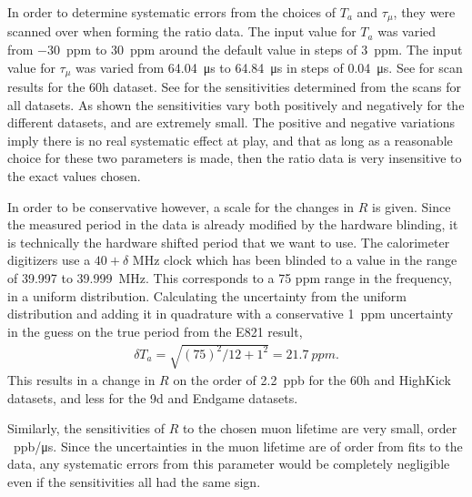 In order to determine systematic errors from the choices of $T_{a}$ and $\tau_{\mu}$, they were scanned over when forming the ratio data. The input value for $T_{a}$ was varied from \SI{-30}{ppm} to \SI{+30}{ppm} around the default value in steps of \SI{3}{ppm}. The input value for $\tau_{\mu}$ was varied from \SI{64.04}{\micro s} to \SI{64.84}{\micro s} in steps of \SI{0.04}{\micro s}. See  for scan results for the 60h dataset. See  for the sensitivities determined from the scans for all datasets. As shown the sensitivities vary both positively and negatively for the different datasets, and are extremely small. The positive and negative variations imply there is no real systematic effect at play, and that as long as a reasonable choice for these two parameters is made, then the ratio data is very insensitive to the exact values chosen. 

In order to be conservative however, a scale for the changes in $R$ is given. Since the measured \gmtwo period in the data is already modified by the hardware blinding, it is technically the hardware shifted \gmtwo period that we want to use. The calorimeter digitizers use a $40 + \delta$ MHz clock which has been blinded to a value in the range of 39.997 to \SI{39.999}{MHz}\cite{ClockManual}. This corresponds to a 75 ppm range in the frequency, in a uniform distribution. Calculating the uncertainty from the uniform distribution and adding it in quadrature with a conservative \SI{1}{ppm} uncertainty in the guess on the true \gmtwo period from the E821 result, 
            \begin{align}
                \delta T_{a} = \sqrt{(75)^{2}/12 + 1^{2}} = \SI{21.7}{ppm}.
            \end{align}
This results in a change in $R$ on the order of \SI{2.2}{ppb} for the 60h and HighKick datasets, and less for the 9d and Endgame datasets. 


Similarly, the sensitivities of $R$ to the chosen muon lifetime are very small, order \SI{}{ppb/ \micro s}. Since the uncertainties in the muon lifetime are of order \ns{} from fits to the data, any systematic errors from this parameter would be completely negligible even if the sensitivities all had the same sign.


